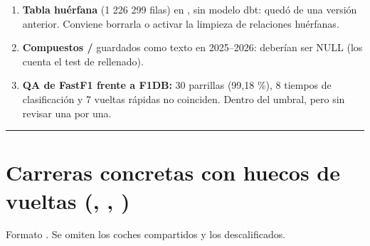 \begin{enumerate}
\item \textbf{Tabla huérfana } (1 226 299 filas) en , sin modelo dbt: quedó de una versión anterior. Conviene borrarla o activar la limpieza de relaciones huérfanas.
\item \textbf{Compuestos /} guardados como texto en 2025–2026: deberían ser NULL (los cuenta el test de rellenado).
\item \textbf{QA de FastF1 frente a F1DB:} 30 parrillas (99,18 \%), 8 tiempos de clasificación y 7 vueltas rápidas no coinciden. Dentro del umbral, pero sin revisar una por una.
\end{enumerate}

\medskip\noindent\textcolor{muted!40}{\rule{\linewidth}{0.3pt}}\medskip

\section{Carreras concretas con huecos de vueltas (, , )}

Formato . Se omiten los coches compartidos y los descalificados.


